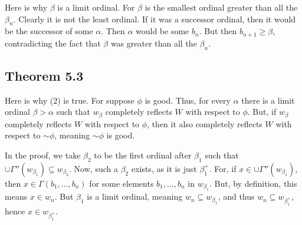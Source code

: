 \documentclass{article}
\newcommand*{\oldneg}{\mathord{\sim}}
\theoremstyle{definition}
\begin{document}
Here is why $\beta$ is a limit ordinal. For $\beta$ is the smallest ordinal greater than all the 
$\beta_n$. Clearly it is not the least ordinal. If it was a successor ordinal, then it would be the 
successor of some $\alpha$. Then $\alpha$ would be some $b_n$. But then $b_{n+1}\ge\beta$, contradicting the 
fact that $\beta$ was greater than all the $\beta_n$.

\subsection*{Theorem 5.3}
Here is why (2) is true. For suppose $\phi$ is good. Thus, for every $\alpha$ there is a limit ordinal 
$\beta>\alpha$ such that $w_\beta$ completely reflects $W$ with respect to $\phi$. But, if 
$w_\beta$ completely reflects $W$ with respect to $\phi$, then it also completely reflects 
$W$ with respect to $\oldneg\phi$, meaning $\oldneg\phi$ is good.

In the proof, we take $\beta_2$ to be the first ordinal after $\beta_1$ such that 
$\cup\Gamma''(w_{\beta_1})\subseteq w_{\beta_2}$. Now, such a $\beta_2$ exists, as it is just 
$\beta_1^+$. For, 
if $x\in\cup\Gamma''(w_{\beta_1})$, then $x\in\Gamma(b_1,...,b_n)$ for some elements 
$b_1,...,b_n$ in $w_{\beta_1}$. But, by definition, this means $x\in w_n$. But $\beta_1$ is a limit 
ordinal, meaning $w_n\subseteq w_{\beta_1}$, and thus $w_n\subseteq w_{\beta_1^+}$, hence 
$x\in w_{\beta_1^+}$.
\end{document}
